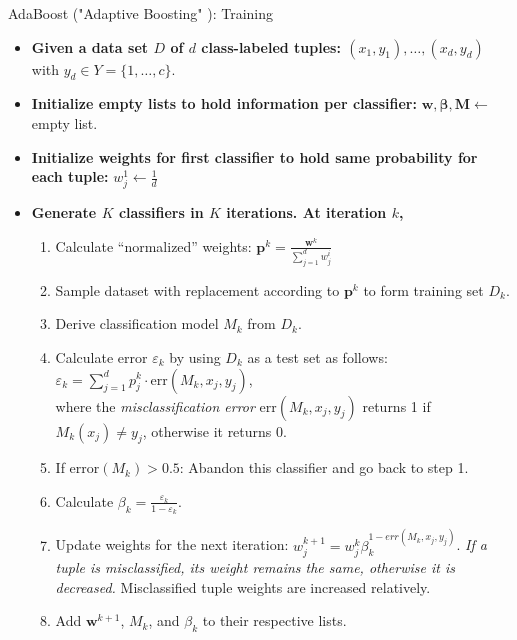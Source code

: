 \begin{frame}{AdaBoost ("Adaptive Boosting" ): Training}
	\vspace*{-1em}
	\begin{itemize}
		\item \textbf{Given a data set $D$ of $d$ class-labeled tuples: $(x_1 , y_1), \ldots, (x_d, y_d)$} with $y_d \in Y = \{1, \dots, c\}$.
		\item \textbf{Initialize empty lists to hold information per classifier:} $\textbf{w}, \boldsymbol{\beta}, \textbf{M} \leftarrow $ empty list.
		\item \textbf{Initialize weights for first classifier to hold same probability for each tuple:} $w_j^1 \leftarrow \frac{1}{d}$
		\item \textbf{Generate $K$ classifiers in $K$ iterations. At iteration $k$,}
		      \begin{enumerate}
			      \item Calculate ``normalized'' weights: $\textbf{p}^k = \frac{\textbf{w}^k}{\sum_{j=1}^d w_j^i}$
			      \item Sample dataset with replacement according to $\textbf{p}^k$ to form training set $D_k$.
			      \item Derive classification model $M_k$ from $D_k$.
			      \item Calculate error $\varepsilon_k$ by using $D_k$ as a test set as follows: $\varepsilon_k = \sum_{j=1}^{d} p^k_j \cdot \text{err}(M_k, x_j, y_j)$,\\
			            where the \textit{misclassification error} $\text{err}(M_k, x_j, y_j)$ returns 1 if $M_k(x_j) \neq y_j$, otherwise it returns $0$.
			      \item If $\text{error}(M_k)>0.5$: Abandon this classifier and go back to step 1.
			      \item Calculate $\beta_k = \frac{\varepsilon_k}{1 - \varepsilon_k}$.
			      \item Update weights for the next iteration: $w^{k+1}_j=w^k_j \beta^{1-err(M_k, x_j, y_j)}_k$. \textit{If a tuple is misclassified, its weight remains the same, otherwise it is decreased.} Misclassified tuple weights are increased relatively.
			      \item Add $\textbf{w}^{k+1}$, $M_k$, and $\beta_k$ to their respective lists.
		      \end{enumerate}
	\end{itemize}
\end{frame}

